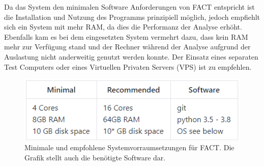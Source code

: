 \documentclass[a4paper]{book}
\begin{document}
\begin{large}
\begin{onehalfspace}
\begin{lstlisting}
\end{lstlisting}

\noindent Da das System den minimalen Software Anforderungen von FACT entspricht ist die Installation und Nutzung des Programms prinzipiell möglich, jedoch empfiehlt sich ein System mit mehr RAM, da dies die Performanz der Analyse erhöht. Ebenfalls kam es bei dem eingesetzten System vermehrt dazu, dass kein RAM mehr zur Verfügung stand und der Rechner während der Analyse aufgrund der Auslastung nicht anderweitig genutzt werden konnte. Der Einsatz eines separaten Test Computers oder eines Virtuellen Privaten Servers (VPS) ist zu empfehlen. \\

\begin{figure}[ht]
\begin{center}
\includegraphics[scale=0.7]{images/FACT_system_requirements} 
\caption{Minimale und empfohlene Systemvorraumsetzungen für FACT. Die Grafik stellt auch die benötigte Software dar. \cite{PeterWeidenbachJohannesvomDorp.2020} }
\label{fig:FACT System Requirements}
\end{center}
\end{figure}


\end{onehalfspace}



\end{large}
\end{document}

